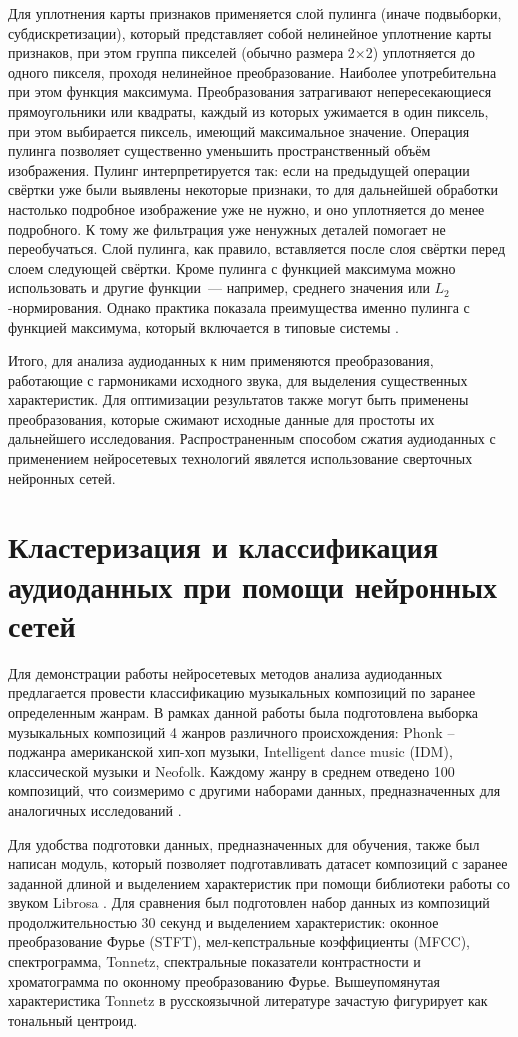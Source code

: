 Для уплотнения карты признаков применяется слой пулинга (иначе подвыборки, субдискретизации), который представляет собой нелинейное уплотнение карты признаков, при этом группа пикселей (обычно размера 2×2) уплотняется до одного пикселя, проходя нелинейное преобразование. Наиболее употребительна при этом функция максимума. Преобразования затрагивают непересекающиеся прямоугольники или квадраты, каждый из которых ужимается в один пиксель, при этом выбирается пиксель, имеющий максимальное значение. Операция пулинга позволяет существенно уменьшить пространственный объём изображения. Пулинг интерпретируется так: если на предыдущей операции свёртки уже были выявлены некоторые признаки, то для дальнейшей обработки настолько подробное изображение уже не нужно, и оно уплотняется до менее подробного. К тому же фильтрация уже ненужных деталей помогает не переобучаться. Слой пулинга, как правило, вставляется после слоя свёртки перед слоем следующей свёртки.
Кроме пулинга с функцией максимума можно использовать и другие функции — например, среднего значения или $L_2$-нормирования. Однако практика показала преимущества именно пулинга с функцией максимума, который включается в типовые системы \cite{wikiconv}. 

Итого, для анализа аудиоданных к ним применяются преобразования, работающие с гармониками исходного звука, для выделения
существенных характеристик. Для оптимизации результатов также могут быть применены преобразования, которые сжимают исходные данные для простоты их дальнейшего исследования.
Распространенным способом сжатия аудиоданных с применением нейросетевых технологий явялется использование сверточных нейронных сетей.

\section{Кластеризация и классификация аудиоданных при помощи нейронных сетей}
Для демонстрации работы нейросетевых методов анализа аудиоданных предлагается провести классификацию музыкальных композиций
по заранее определенным жанрам. В рамках данной работы была подготовлена выборка музыкальных композиций 4 жанров различного происхождения:
Phonk -- поджанра американской хип-хоп музыки, Intelligent dance music (IDM), классической музыки и Neofolk. Каждому жанру в среднем отведено 100 композиций, что соизмеримо с другими наборами данных, предназначенных для аналогичных исследований \cite{gtzan}.

Для удобства подготовки данных, предназначенных для обучения, также был написан модуль, который позволяет подготавливать датасет композиций
с заранее заданной длиной и выделением характеристик при помощи библиотеки работы со звуком Librosa \cite{librosa}. Для сравнения был подготовлен набор данных из
композиций продолжительностью 30 секунд и выделением характеристик: оконное преобразование Фурье (STFT), мел-кепстральные коэффициенты (MFCC), спектрограмма, Tonnetz, спектральные показатели контрастности и хроматограмма по оконному преобразованию Фурье.  Вышеупомянутая характеристика Tonnetz в русскоязычной литературе зачастую фигурирует как тональный центроид.

